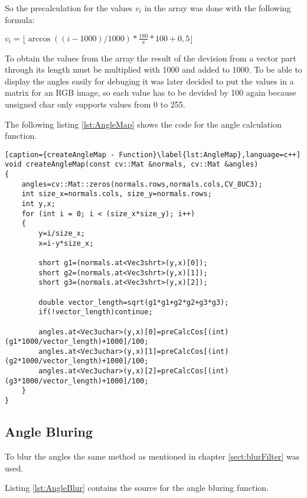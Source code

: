 So the precalculation for the values $v_i$ in the array was done with the following formula:

$v_i=\lfloor \arccos ((i-1000)/1000) * \frac{180}{\pi}*100 + 0,5 \rfloor$

To obtain the values from the array the result of the devision from a vector part through its length
must be multiplied with 1000 and added to 1000. To be able to display the angles easily for debuging 
it was later decided to put the values in a matrix for an RGB image, so each value has to be devided 
by 100 again because unsigned char only supports values from 0 to 255.

The following listing \vref{lst:AngleMap} shows the code for the angle calculation function.

\begin{lstlisting}[caption={createAngleMap - Function}\label{lst:AngleMap},language=c++]
void createAngleMap(const cv::Mat &normals, cv::Mat &angles)
{
	angles=cv::Mat::zeros(normals.rows,normals.cols,CV_8UC3);
	int size_x=normals.cols, size_y=normals.rows;
	int y,x;
	for (int i = 0; i < (size_x*size_y); i++)
	{
		y=i/size_x;
		x=i-y*size_x;

		short g1=(normals.at<Vec3shrt>(y,x)[0]);
		short g2=(normals.at<Vec3shrt>(y,x)[1]);
		short g3=(normals.at<Vec3shrt>(y,x)[2]);

		double vector_length=sqrt(g1*g1+g2*g2+g3*g3);
		if(!vector_length)continue;

		angles.at<Vec3uchar>(y,x)[0]=preCalcCos[(int)(g1*1000/vector_length)+1000]/100;
		angles.at<Vec3uchar>(y,x)[1]=preCalcCos[(int)(g2*1000/vector_length)+1000]/100;
		angles.at<Vec3uchar>(y,x)[2]=preCalcCos[(int)(g3*1000/vector_length)+1000]/100;
	}
}	
\end{lstlisting}

\subsection{Angle Bluring}

To blur the angles the same method as mentioned in chapter \vref{sect:blurFilter} was used.

Listing \vref{lst:AngleBlur} contains the source for the angle bluring function.

